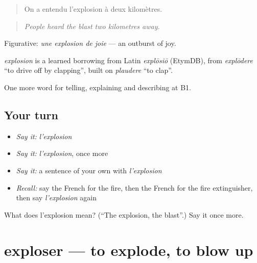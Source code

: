 \begin{quote}
On a entendu l'explosion à deux kilomètres.
\end{quote}

\begin{quote}
\emph{People heard the blast two kilometres away.}
\end{quote}

Figurative: \emph{une explosion de joie} — an outburst of joy.

\begin{cousinweb}
\emph{explosion} is a learned borrowing from Latin \emph{explōsiō} (EtymDB), from \emph{explōdere} \textquotedblleft{}to drive off by clapping\textquotedblright{}, built on \emph{plaudere} \textquotedblleft{}to clap\textquotedblright{}.
\end{cousinweb}

\begin{grammarlens}[title={What you've built}]
One more word for telling, explaining and describing at B1.
\end{grammarlens}

\subsection*{Your turn}
\begin{itemize}
\raggedright
  \item \emph{Say it:} \emph{l'explosion}
  \item \emph{Say it:} \emph{l'explosion}, once more
  \item \emph{Say it:} a sentence of your own with \emph{l'explosion}
  \item \emph{Recall:} say the French for the fire, then the French for the fire extinguisher, then say \emph{l'explosion} again
\end{itemize}

\begin{tcolorbox}[breakable,colback=teal!4,colframe=teal!35!black,title={Before you move on}]
What does l'explosion mean? (\textquotedblleft{}The explosion, the blast\textquotedblright{}.) Say it once more.
\end{tcolorbox}
\section[exploser]{exploser — to explode, to blow up}

\label{lesson:FR-C302-exploser}



